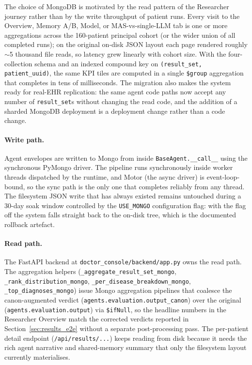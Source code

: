 The choice of MongoDB is motivated by the read pattern of the
Researcher journey rather than by the write throughput of patient
runs. Every visit to the Overview, Memory A/B, Model, or
MAS-vs-single-LLM tab is one or more aggregations across the
160-patient principal cohort (or the wider union of all completed
runs); on the original on-disk JSON layout each page rendered roughly
$\sim$5 thousand file reads, so latency grew linearly with cohort
size. With the four-collection schema and an indexed compound key on
\texttt{(result\_set, patient\_uuid)}, the same KPI tiles are computed
in a single \texttt{\$group} aggregation that completes in tens of
milliseconds. The migration also makes the system ready for
real-EHR replication: the same agent code paths now accept any number
of \texttt{result\_set}s without changing the read code, and the
addition of a sharded MongoDB deployment is a deployment change rather
than a code change.

\paragraph{Write path.}
Agent envelopes are written to Mongo from inside
\texttt{BaseAgent.\_\_call\_\_} using the synchronous PyMongo driver. The
pipeline runs synchronously inside worker threads dispatched by the
runtime, and Motor (the async driver) is event-loop-bound, so the
sync path is the only one that completes reliably from any thread.
The filesystem JSON write that has always existed remains untouched
during a 30-day soak window controlled by the \texttt{USE\_MONGO}
configuration flag: with the flag off the system falls straight back
to the on-disk tree, which is the documented rollback artefact.

\paragraph{Read path.}
The FastAPI backend at \texttt{doctor\_console/backend/app.py} owns
the read path. The aggregation helpers
(\texttt{\_aggregate\_result\_set\_mongo},
\texttt{\_rank\_distribution\_mongo},
\texttt{\_per\_disease\_breakdown\_mongo},
\texttt{\_top\_diagnoses\_mongo}) issue Mongo aggregation pipelines
that coalesce the canon-augmented verdict
(\texttt{agents.evaluation.output\_canon}) over the original
(\texttt{agents.evaluation.output}) via \texttt{\$ifNull}, so the
headline numbers in the Researcher Overview match the corrected
verdicts reported in Section~\ref{sec:results_e2e} without a separate
post-processing pass. The per-patient detail endpoint
(\texttt{/api/results/...}) keeps reading from disk because it needs
the rich agent narrative and shared-memory summary that only the
filesystem layout currently materialises.

